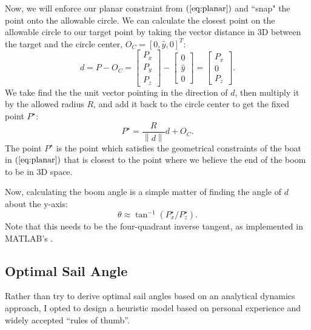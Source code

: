 \documentclass[letterpaper, 10 pt, conference]{ieeeconf}  %
\newcommand{\eq}[1]{$\left(\ref{eq:#1}\right)$}
\newcommand{\norm}[1]{\left\lVert #1 \right\rVert}
\begin{document}
Now, we will enforce our planar constraint from \eq{planar} and ``snap" the point onto the allowable circle. We can calculate the closest point on the allowable circle to our target point by taking the vector distance in 3D between the target and the circle center, $O_C = [0, \hat{y}, 0]^T$: 
\[
d = P - O_C = \left[\begin{array}{c}P_x \\P_y \\P_z \end{array}\right] - \left[\begin{array}{c}0 \\ \hat{y} \\ 0\end{array}\right] = \left[\begin{array}{c}P_x\\ 0 \\ P_z\end{array}\right].
\]
We take find the the unit vector pointing in the direction of $d$, then multiply it by the allowed radius $R$, and add it back to the circle center to get the fixed point $P^\star$:
\[
P^\star = \frac{R}{\norm{d}}d + O_C.
\]
The point $P^\star$ is the point which satisfies the geometrical constraints of the boat in \eq{planar} that is closest to the point where we believe the end of the boom to be in 3D space.

Now, calculating the boom angle is a simple matter of finding the angle of $d$ about the y-axis:
\[
\theta \approx \tan^{-1}\left({P^\star_x/P^\star_z}\right).
\]
Note that this needs to be the four-quadrant inverse tangent, as implemented in MATLAB's .


\subsection{Optimal Sail Angle}
\label{sec:optimal}
Rather than try to derive optimal sail angles based on an analytical dynamics approach, I opted to design a heuristic model based on personal experience and widely accepted ``rules of thumb''. 
\end{document}
